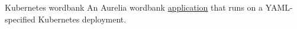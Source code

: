 \datedsubsection{}
{Kubernetes wordbank}
{}
{ An Aurelia wordbank \href{https://github.com/JacobArchambault/aurelia-wordbank-with-kubernetes/}{application} that runs on a YAML-specified Kubernetes deployment.}
